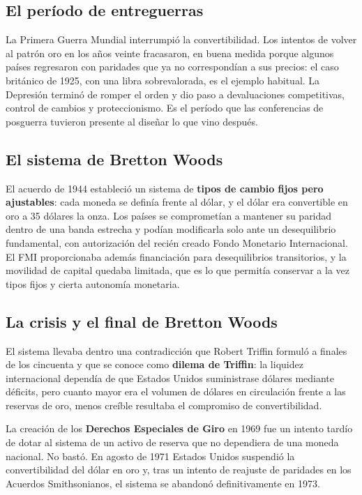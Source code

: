 \subsection{El período de entreguerras}

La Primera Guerra Mundial interrumpió la convertibilidad. Los intentos de volver
al patrón oro en los años veinte fracasaron, en buena medida porque algunos
países regresaron con paridades que ya no correspondían a sus precios: el caso
británico de 1925, con una libra sobrevalorada, es el ejemplo habitual. La
Depresión terminó de romper el orden y dio paso a devaluaciones competitivas,
control de cambios y proteccionismo. Es el período que las conferencias de
posguerra tuvieron presente al diseñar lo que vino después.

\subsection{El sistema de Bretton Woods}

El acuerdo de 1944 estableció un sistema de \textbf{tipos de cambio fijos pero
ajustables}: cada moneda se definía frente al dólar, y el dólar era convertible
en oro a 35 dólares la onza. Los países se comprometían a mantener su paridad
dentro de una banda estrecha y podían modificarla solo ante un desequilibrio
fundamental, con autorización del recién creado Fondo Monetario Internacional.
El FMI proporcionaba además financiación para desequilibrios transitorios, y la
movilidad de capital quedaba limitada, que es lo que permitía conservar a la vez
tipos fijos y cierta autonomía monetaria.

\subsection{La crisis y el final de Bretton Woods}

El sistema llevaba dentro una contradicción que Robert Triffin formuló a finales
de los cincuenta y que se conoce como \textbf{dilema de Triffin}: la liquidez
internacional dependía de que Estados Unidos suministrase dólares mediante
déficits, pero cuanto mayor era el volumen de dólares en circulación frente a
las reservas de oro, menos creíble resultaba el compromiso de convertibilidad.

La creación de los \textbf{Derechos Especiales de Giro} en 1969 fue un intento
tardío de dotar al sistema de un activo de reserva que no dependiera de una
moneda nacional. No bastó. En agosto de 1971 Estados Unidos suspendió la
convertibilidad del dólar en oro y, tras un intento de reajuste de paridades en
los Acuerdos Smithsonianos, el sistema se abandonó definitivamente en 1973.

